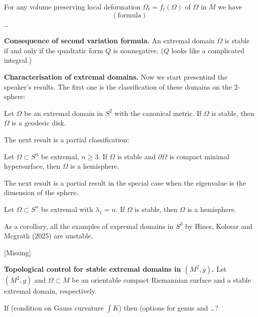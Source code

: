 \begin{theorem}
\label{theorem-scn}
For any volume preserving local deformation
$\Omega_t = f_t (\Omega)$ of $\Omega$ in $M$
we have
$$
\operatorname{(formula)}
$$
…
\end{theorem}

\medskip\noindent
{\bf Consequence of second variation
formula.}
An extremal domain  $\Omega$ is stable
if and only if the quadratic form $Q$ is
nonnegative. ($Q$ 
looks like a complicated integral.)

\medskip\noindent
{\bf Characterisation of extremal domains.}
Now we start presentind the speaker's
results. The first one is the classification
of these domains on the 2-sphere:

\begin{theorem}[Cavalcante-N, 2024]
\label{theorem-cn24}
Let $\Omega$ be an extremal domain in $S^2$
with the canonical metric. If $\Omega$ is
stable, then $\Omega$ is a geodesic disk.
\end{theorem}

\noindent
The next result is a partial classification:

\begin{theorem}[CN-24]
\label{theorem-cn24-2}
Let $\Omega\subset S^n$ be extremal, $n \geq
3$. If $\Omega$ is stable and $\partial
\Omega$ is compact minimal hypersurface,
then $\Omega$ is a hemisphere.
\end{theorem}

\noindent
The next result is a partial result in the
special case when the eigenvalue is the
dimension of the sphere.

\begin{theorem}[CN]
\label{theorem-cn-3}
Let $\Omega \subset S^n$ be extremal with
$\lambda_1 = n$. If $\Omega$ is stable,
then $\Omega$ is a hemisphere.
\end{theorem}

\noindent
As a corollary, all the examples of expremal
domains in $S^3$ by Hines, Kolesar and
Mcgrath (2025) are unstable.

\begin{theorem}[CN]
\label{theorem-cn-4}
[Missing]
\end{theorem}

\medskip\noindent
{\bf Topological control for stable extremal
domains in $(M^2,g)$.}
Let $(M^2,g)$ and $\Omega \subset M$ be an
orientable compact Riemannian surface and a
stable extremal domain, respectively.

\begin{theorem}[Cavalcante-N, 24]
\label{theorem-cn24-5}
If (condition on Gauss curvature
$\int K$) then (options for genus and …?
\end{theorem}

